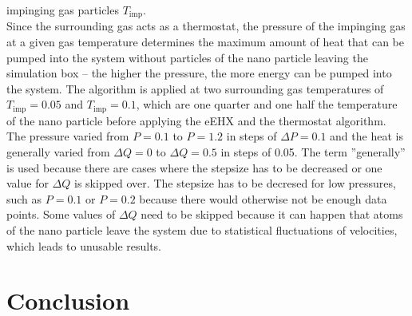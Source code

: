 \documentclass[12pt]{article}
\begin{document}
impinging gas particles $T_\text{imp}$.\\
Since the surrounding gas acts as a thermostat, the pressure of the impinging gas at a given gas temperature determines the maximum amount of heat that
can be pumped into the system without particles of the nano particle leaving the simulation box -- the higher the pressure, the more energy can be
pumped into the system. The algorithm is applied at two surrounding gas temperatures of $T_\text{imp} = 0.05$ and $T_\text{imp} = 0.1$, 
which are one quarter and one half the temperature of the nano particle before applying the eEHX and the thermostat algorithm. The pressure varied
from $P=0.1$ to $P=1.2$ in steps of $\Delta P=0.1$ and the heat is generally varied from $\Delta Q=0$ to $\Delta Q=0.5$ in steps of 0.05. The term
''generally'' is used because there are cases where the stepsize has to be decreased or one value for $\Delta Q$ is skipped over. The stepsize has to
be decresed for low pressures, such as $P=0.1$ or $P=0.2$ because there would otherwise not be enough data points. Some values of $\Delta Q$ need to
be skipped because it can happen that atoms of the nano particle leave the system due to statistical fluctuations of velocities, which leads to
unusable results.\\













\newpage
\section{Conclusion}






\newpage


\end{document}
